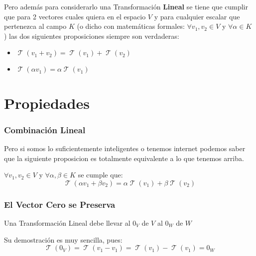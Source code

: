 \documentclass[12pt]{report}                                    %
\DeclareMathOperator \LinealTransformation {\mathcal{T}}        %
\DeclareMathOperator \LT {\mathcal{T}}                          %
\begin{document}
        Pero además para considerarlo una Transformación \textbf{Lineal} se tiene que cumplir que
        para 2 vectores cuales quiera en el espacio $V$ y para cualquier escalar que pertenezca
        al campo $K$ (o dicho con matemáticas formales: $\forall v_1, v_2 \in V $ y $\forall \alpha \in K$ )
        las dos siguientes proposiciones siempre son verdaderas:

        \begin{itemize}
            \item $\LinealTransformation (v_1 + v_2) = \LinealTransformation(v_1) + \LinealTransformation(v_2)$
            \item $\LinealTransformation (\alpha v_1) = \alpha \LinealTransformation(v_1)$ 
        \end{itemize}

    \section{Propiedades}

        \subsubsection{Combinación Lineal}
            Pero si somos lo suficientemente inteligentes o tenemos internet podemos
            saber que la siguiente proposicion es totalmente equivalente a lo que
            tenemos arriba.

            $\forall v_1, v_2 \in V$ y $\forall \alpha, \beta \in K$ se cumple que:
            \begin{equation}
                \LT(\alpha v_1 + \beta v_2) = \alpha \LT(v_1) + \beta \LT(v_2)
            \end{equation}

        \subsubsection{El Vector Cero se Preserva}
            Una Transformación Lineal debe llevar al $0_V$ de $V$ al $0_W$ de $W$

            Su demostración es muy sencilla, pues:
            \begin{equation*}
                \LinealTransformation(0_V)      =
                \LinealTransformation(v_1-v_1)  =
                \LT(v_1) - \LT(v_1)             = 0_W
            \end{equation*}
\end{document}

